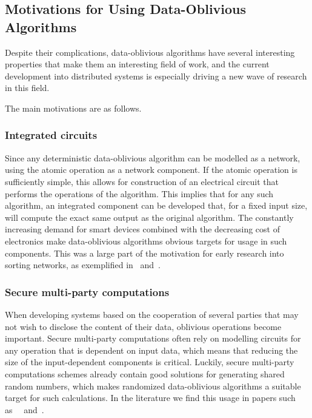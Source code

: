 \subsection{Motivations for Using Data-Oblivious Algorithms}

Despite their complications, data-oblivious algorithms have several interesting properties that make them an interesting field of work, and the current development into distributed systems is especially driving a new wave of research in this field.

The main motivations are as follows.

\subsubsection{Integrated circuits}

Since any deterministic data-oblivious algorithm can be modelled as a network, using the atomic operation as a network component. If the atomic operation is sufficiently simple, this allows for construction of an electrical circuit that performs the operations of the algorithm.
This implies that for any such algorithm, an integrated component can be developed that, for a fixed input size, will compute the exact same output as the original algorithm. The constantly increasing demand for smart devices combined with the decreasing cost of electronics make data-oblivious algorithms obvious targets for usage in such components.
This was a large part of the motivation for early research into sorting networks, as exemplified in~ and~. 

\subsubsection{Secure multi-party computations}

When developing systems based on the cooperation of several parties that may not wish to disclose the content of their data, oblivious operations become important. Secure multi-party computations often rely on modelling circuits for any operation that is dependent on input data, which means that reducing the size of the input-dependent components is critical.
Luckily, secure multi-party computations schemes already contain good solutions for generating shared random numbers, which makes randomized data-oblivious algorithms a suitable target for such calculations.
In the literature we find this usage in papers such as~~ and~.


